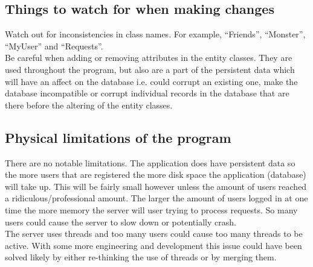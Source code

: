 \documentclass[titlepage]{article}
\begin{document}
{\subsection{Things to watch for when making changes}
Watch out for inconsistencies in class names. For example, “Friends”, “Monster”, “MyUser” and “Requests”.
\\
Be careful when adding or removing attributes in the entity classes. They are used throughout the program, but also are a part of the persistent data which will have an affect on the database i.e. could corrupt an existing one, make the database incompatible or corrupt individual records in the database that are there before the altering of the entity classes.
\subsection{Physical limitations of the program}
There are no notable limitations. The application does have persistent data so the more users that are registered the more disk space the application (database) will take up. This will be fairly small however unless the amount of users reached a ridiculous/professional amount. The larger the amount of users logged in at one time the more memory the server will user trying to process requests. So many users could cause the server to slow down or potentially crash.
\\
The server uses threads and too many users could cause too many threads to be active. With some more engineering and development this issue could have been solved likely by either re-thinking the use of threads or by merging them.
}
\end{document}
